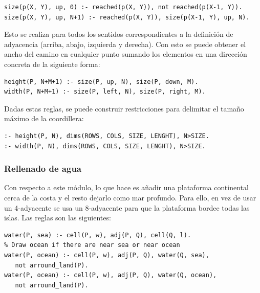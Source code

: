 \begin{lstlisting}[label=lst:msizedef]
size(p(X, Y), up, 0) :- reached(p(X, Y)), not reached(p(X-1, Y)).
size(p(X, Y), up, N+1) :- reached(p(X, Y)), size(p(X-1, Y), up, N).
\end{lstlisting}

\hspace{1em}

Esto se realiza para todos los sentidos correspondientes a la definición de adyacencia (arriba, abajo, izquierda y derecha). Con esto se puede obtener el ancho del camino en cualquier punto sumando los elementos en una dirección concreta de la siguiente forma:

\begin{lstlisting}[label=lst:msize]
height(P, N+M+1) :- size(P, up, N), size(P, down, M).
width(P, N+M+1) :- size(P, left, N), size(P, right, M).
\end{lstlisting}

\hspace{1em}

Dadas estas reglas, se puede construir restricciones para delimitar el tamaño máximo de la coordillera: \\

\begin{lstlisting}[label=lst:msizeforbidden]
:- height(P, N), dims(ROWS, COLS, SIZE, LENGHT), N>SIZE.
:- width(P, N), dims(ROWS, COLS, SIZE, LENGHT), N>SIZE.
\end{lstlisting}

\subsubsection{Rellenado de agua}

Con respecto a este módulo, lo que hace es añadir una plataforma continental cerca de la costa y el resto dejarlo como mar profundo. Para ello, en vez de usar un 4-adyacente se usa un 8-adyacente para que la plataforma bordee todas las islas. Las reglas son las siguientes: \\

\begin{lstlisting}[label=lst:water]
% Draw sea if there are near land
water(P, sea) :- cell(P, w), adj(P, Q), cell(Q, l).
% Draw ocean if there are near sea or near ocean
water(P, ocean) :- cell(P, w), adj(P, Q), water(Q, sea),
   not arround_land(P).
water(P, ocean) :- cell(P, w), adj(P, Q), water(Q, ocean),
   not arround_land(P).
\end{lstlisting}

